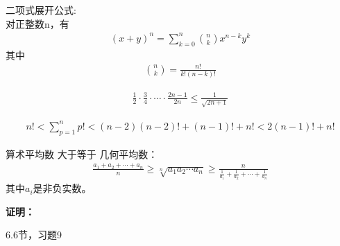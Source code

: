 \documentclass{article}
\begin{document}
\begin{zremark}
    二项式展开公式: \\
    对正整数n，有
    \begin{align*}
        (x + y)^n = \sum\limits_{k = 0}^n \binom{n}{k} x^{n - k} y^k
    \end{align*}
    其中
    \begin{align*}
        \binom{n}{k} = \frac{n!}{k!(n - k)!}
    \end{align*}
\end{zremark}

\begin{zremark}
    \begin{align*}
        \frac{1}{2} \cdot \frac{3}{4} \cdot \cdots \cdot \frac{2n - 1}{2n} \leq \frac{1}{\sqrt{2n + 1}}
    \end{align*}
\end{zremark}

\begin{zremark}
    \begin{align*}
        n ! < \sum \limits_{p = 1}^n p !
        < (n - 2)(n-2)! + (n - 1)! + n!
        < 2(n - 1)! + n !
    \end{align*}
\end{zremark}

\begin{zremark}
    算术平均数 大于等于 几何平均数：
    \begin{align*}
        \frac{a_1 + a_2 + \cdots + a_n}{n} \geq \sqrt[n]{a_1 a_2 \cdots a_n} \geq \frac{n}{\frac{1}{a_1} + \frac{1}{a_2} + \cdots + \frac{1}{a_n}}
    \end{align*}
    其中$a_i$是非负实数。
\end{zremark}

\textbf{证明：}

6.6节，习题9
\end{document}

